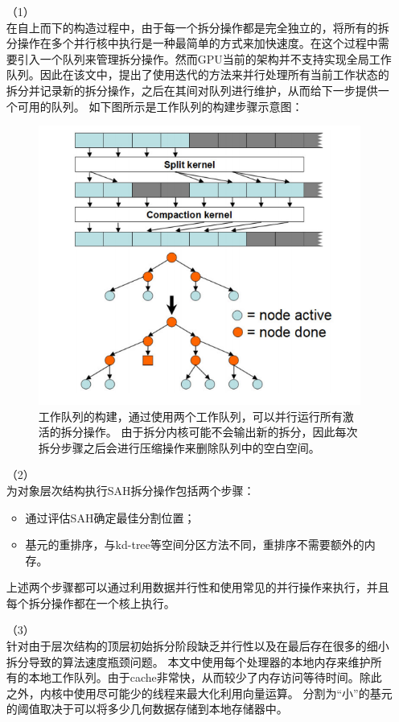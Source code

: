 \documentclass[11pt]{article}
\begin{document}
\begin{itemize}
\item[（1）]{} \mbox{}\\
在自上而下的构造过程中，由于每一个拆分操作都是完全独立的，将所有的拆分操作在多个并行核中执行是一种最简单的方式来加快速度。在这个过程中需要引入一个队列来管理拆分操作。然而GPU当前的架构并不支持实现全局工作队列。因此在该文中，提出了使用迭代的方法来并行处理所有当前工作状态的拆分并记录新的拆分操作，之后在其间对队列进行维护，从而给下一步提供一个可用的队列。	如下图所示是工作队列的构建步骤示意图：
\begin{figure}[H]
\begin{center}
\includegraphics[scale=0.7]{SAH1.png}
\caption{工作队列的构建，通过使用两个工作队列，可以并行运行所有激活的拆分操作。 由于拆分内核可能不会输出新的拆分，因此每次拆分步骤之后会进行压缩操作来删除队列中的空白空间。}
\end{center}
\end{figure}
\item[（2）]{} \mbox{}\\
为对象层次结构执行SAH拆分操作包括两个步骤：
\begin{itemize}
\item{通过评估SAH确定最佳分割位置；}
\item{基元的重排序，与kd-tree等空间分区方法不同，重排序不需要额外的内存。}
\end{itemize}
上述两个步骤都可以通过利用数据并行性和使用常见的并行操作来执行，并且每个拆分操作都在一个核上执行。
\item[（3）]{} \mbox{}\\
针对由于层次结构的顶层初始拆分阶段缺乏并行性以及在最后存在很多的细小拆分导致的算法速度瓶颈问题。
本文中使用每个处理器的本地内存来维护所有的本地工作队列。由于cache非常快，从而较少了内存访问等待时间。除此之外，内核中使用尽可能少的线程来最大化利用向量运算。 分割为“小”的基元的阈值取决于可以将多少几何数据存储到本地存储器中。

\end{itemize}
\end{document}
